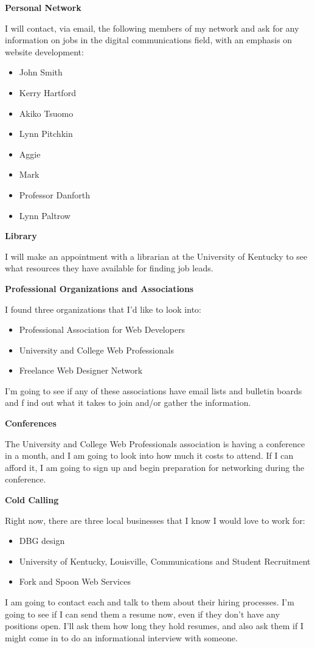 \textbf{Personal Network}

I will contact, via email, the following members of my network and ask for any information on jobs in the digital communications field, with an emphasis on website development:
\begin{itemize}
\item John Smith
\item Kerry Hartford
\item Akiko Tsuomo
\item Lynn Pitchkin
\item Aggie
\item Mark
\item Professor Danforth
\item Lynn Paltrow 
\end{itemize}
\textbf{Library}

I will make an appointment with a librarian at the University of Kentucky to see what resources they have available for finding job leads.

\textbf{Professional Organizations and Associations}

I found three organizations that I'd like to look into:
\begin{itemize}
\item Professional Association for Web Developers
\item University and College Web Professionals
\item Freelance Web Designer Network
\end{itemize}
I'm going to see if any of these associations have email lists and bulletin boards and f ind out what it takes to join and/or gather the information.

\textbf{Conferences}

The University and College Web Professionals association is having a conference in a month, and I am going to look into how much it costs to attend. If I can afford it, I am going to sign up and begin preparation for networking during the conference.

\textbf{Cold Calling}

Right now, there are three local businesses that I know I would love to work for:
\begin{itemize}
\item DBG design
\item University of Kentucky, Louisville, Communications and Student Recruitment
\item Fork and Spoon Web Services
\end{itemize}
I am going to contact each and talk to them about their hiring processes. I'm going to see if I can send them a resume now, even if they don't have any positions open. I'll ask them how long they hold resumes, and also ask them if I might come in to do an informational interview with someone.
 
